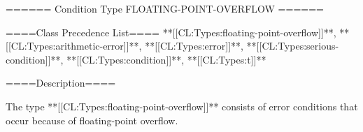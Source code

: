 ====== Condition Type FLOATING-POINT-OVERFLOW ======

====Class Precedence List==== **[[CL:Types:floating-point-overflow]]**, **[[CL:Types:arithmetic-error]]**, **[[CL:Types:error]]**, **[[CL:Types:serious-condition]]**, **[[CL:Types:condition]]**, **[[CL:Types:t]]**

====Description====

The type **[[CL:Types:floating-point-overflow]]** consists of error conditions that occur because of floating-point overflow.


